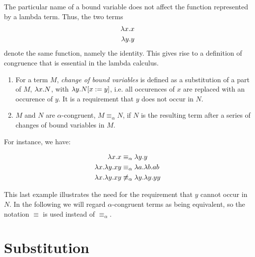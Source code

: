 The particular name of a bound variable does not affect the function represented 
by a lambda term. Thus, the two terms
\begin{align*}
	\lambda x.x \\
	\lambda y.y
\end{align*}
denote the same function, namely the identity. This gives rise to a definition of congruence
that is essential in the lambda calculus.
\begin{definition}
	\begin{enumerate}
		\item For a term $M$, \emph{change of bound variables} is defined as a substitution
		of a part of $M$, $\lambda x.N$, with $\lambda y.N[x:=y]$, i.e. all occurences of $x$
		are replaced with an occurence of $y$. It is a requirement that $y$ does not 
		occur in $N$.
		\item $M$ and $N$ are $\alpha$-congruent, $M\equiv_\alpha N$, if $N$ is the
		resulting term after a series of changes of bound variables in $M$.
	\end{enumerate}
\end{definition} 
For instance, we have:
\begin{example}
\begin{align*}
	\lambda x.x&\equiv_\alpha\lambda y.y \\
	\lambda x.\lambda y.xy&\equiv_\alpha{\lambda a.\lambda b.ab} \\
	\lambda x.\lambda y.xy&\not\equiv_\alpha\lambda y.\lambda y.yy
\end{align*}
\end{example}
This last example illustrates the need for the requirement that $y$ cannot
occur in $N$. In the following we will regard $\alpha$-congruent terms as
being equivalent, so the notation $\equiv$ is used instead of
$\equiv_\alpha$.

\section{Substitution}

